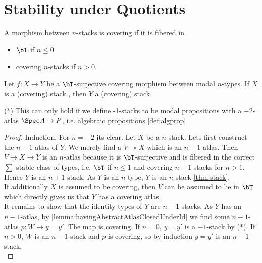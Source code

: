 \section{Stability under Quotients}
\begin{definition}
	A morphism between $n$-stacks is covering if it is fibered in 
	\begin{itemize}
		\item $\bT$ if $n \le 0$
		\item covering $n$-stacks if $n > 0$.
	\end{itemize}
\end{definition}

\begin{theorem}{\label{thm:quotients}}
	Let $f : X \to Y$ be a $\bT$-surjective covering morphism between modal $n$-types. If $X$ is a (covering) stack , then $Y$ a  (covering) stack.
\end{theorem}
(*) This can only hold if we define -1-stacks to be  modal propositions with a $-2$-atlas $\Spec A \to P$, i.e. algebraic propositions \ref{def:algprop} %
\begin{proof}
	Induction.
	For $n = -2$ its clear.
	Let $X$ be a  $n$-stack. Lets first construct the $n-1$-atlas of $Y$.
	We merely find a $V \twoheadrightarrow X$ which is an $n-1$-atlas.  Then $V \to X \to Y$ is an $n$-atlas because it is $\bT$-surjective and is fibered in the correct $\sum$-stable class of types, i.e. $\bT$ if $n \le 1$ and  covering $n-1$-stacks for $n > 1$. Hence $Y$ is an $n+1$-stack. As $Y$ is an $n$-type, $Y$ is an $n$-stack \ref{thm:stack}. \\
	If additionally $X$ is assumed to be covering, then $V$ can be assumed to lie in $\bT$ which directly gives us that $Y$ has a covering atlas. \\
	It remains to show that the identity types of $Y$ are  $n-1$-stacks. As $Y$ has an $n-1$-atlas, by \ref{lemma:havingAbstractAtlasClosedUnderId} we  find some $n-1$-atlas $p : W \to y=y'$. The map is covering. %
	If $n=0$, $y = y'$ is a $-1$-stack by (*). If $n > 0$, $W$ is an $n-1$-stack and $p$ is covering, so by induction $y = y'$ is an $n-1$-stack. \\
	
	
	
\end{proof}
